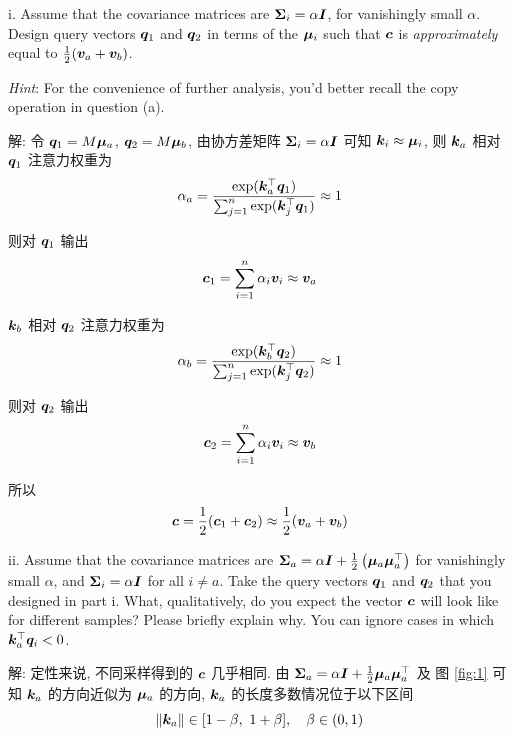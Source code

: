\documentclass{article}
\begin{document}
\quad i. Assume that the covariance matrices are $\bm{\Sigma}_{i}=\alpha \bm{I}$, for vanishingly small $\alpha$. Design query vectors $\bm{q}_1$ and $\bm{q}_2$ in terms of the $\bm{\mu}_i$ such that $\bm{c}$ is \emph{approximately} equal to $\frac{1}{2}(\bm{v}_{a}+\bm{v}_{b})$.

\emph{Hint}: For the convenience of further analysis, you'd better recall the copy operation in question (a).

解: 令 $\bm{q}_1=M\bm{\mu}_a$, $\bm{q}_2=M\bm{\mu}_b$, 由协方差矩阵 $\bm{\Sigma}_{i}=\alpha \bm{I}$ 可知 $\bm{k}_i\approx\bm{\mu}_i$, 则 $\bm{k}_a$ 相对 $\bm{q}_1$ 注意力权重为
\begin{equation}
  \alpha_a
  =\frac{\exp(\bm{k}_{a}^{\top}\bm{q}_1)}{\sum_{j=1}^{n}\exp(\bm{k}_{j}^{\top}\bm{q}_1)}
  \approx1
\end{equation}

则对 $\bm{q}_1$ 输出
\begin{equation}
  \bm{c}_1
  =\sum_{i=1}^{n}\alpha_{i}\bm{v}_{i}
  \approx\bm{v}_a
\end{equation}

$\bm{k}_b$ 相对 $\bm{q}_2$ 注意力权重为
\begin{equation}
  \alpha_b
  =\frac{\exp(\bm{k}_{b}^{\top}\bm{q}_2)}{\sum_{j=1}^{n}\exp(\bm{k}_{j}^{\top}\bm{q}_2)}
  \approx1
\end{equation}

则对 $\bm{q}_2$ 输出
\begin{equation}
  \bm{c}_2
  =\sum_{i=1}^{n}\alpha_{i}\bm{v}_{i}
  \approx\bm{v}_b
\end{equation}

所以
\begin{equation}
  \bm{c}=\frac{1}{2}(\bm{c}_{1}+\bm{c}_{2})\approx\frac{1}{2}(\bm{v}_{a}+\bm{v}_{b})
\end{equation}

\quad ii. Assume that the covariance matrices are $ \bm{\Sigma}_{a}=\alpha\bm{I}+\frac{1}{2}\left(\bm{\mu}_{a} \bm{\mu}_{a}^{\top}\right) $ for vanishingly small $\alpha$, and $\bm{\Sigma}_{i}=\alpha \bm{I}$ for all $i \neq a$. Take the query vectors $\bm{q}_1$ and $\bm{q}_2$ that you designed in part i. What, qualitatively, do you expect the vector $\bm{c}$ will look like for different samples? Please briefly explain why. You can ignore cases in which $\bm{k}_{a}^{\top}\bm{q}_{i}<0$.

解: 定性来说, 不同采样得到的 $\bm{c}$ 几乎相同. 由 $\bm{\Sigma}_{a}=\alpha \bm{I}+\frac{1}{2}\bm{\mu}_{a} \bm{\mu}_{a}^{\top}$ 及 图 \ref{fig:1} 可知 $\bm{k}_a$ 的方向近似为 $\bm{\mu}_a$ 的方向, $\bm{k}_a$ 的长度多数情况位于以下区间
\begin{equation}
  \|\bm{k}_a\|\in[1-\beta,~1+\beta],\quad\beta\in(0,1)
\end{equation}
\end{document}
